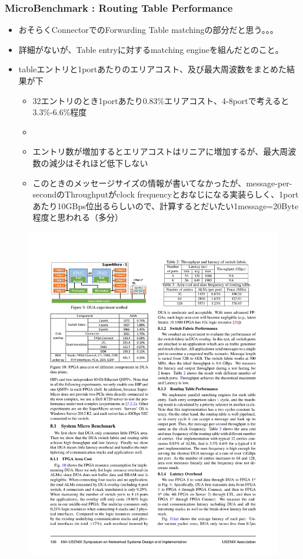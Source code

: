 \documentclass[dvipdfmx,9pt,notheorems]{beamer}
\theoremstyle{definition}
\begin{document}
\begin{frame}\frametitle{MicroBenchmark : Routing Table Performance}
	\begin{itemize}
			\item おそらくConnectorでのForwarding Table matchingの部分だと思う。。。
			\item 詳細がないが、Table entryに対するmatching engineを組んだとのこと。
			\item tableエントリと1portあたりのエリアコスト、及び最大周波数をまとめた結果が下
				\begin{itemize}
					\item 32エントリのとき1portあたり0.83\%エリアコスト、4-8portで考えると3.3\%-6.6\%程度
					\item 
					\item エントリ数が増加するとエリアコストはリニアに増加するが、最大周波数の減少はそれほど低下しない
					\item このときのメッセージサイズの情報が書いてなかったが、message-per-secondのThroughputがclock frequencyとおなじになる実装らしく、1portあたり10GBps位出るらしいので、計算するとだいたい1message=20Byte程度と思われる（多分）
				\end{itemize}
	\end{itemize}
  \begin{figure}[htb]
		\includegraphics[scale=1.0]{fig/table3.pdf}
  \end{figure}
\pnote{
}
\end{frame}
\end{document}
